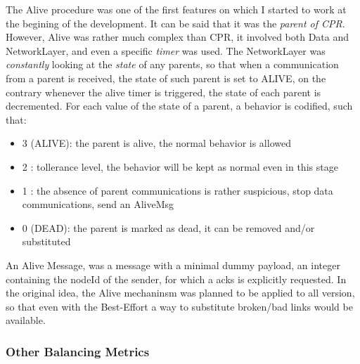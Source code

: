 \documentclass{article}
\begin{document}
The Alive procedure was one of the first features on which I started to work at the begining of the development. It can be said that it was the \emph{parent of CPR}. However, Alive was rather much complex than CPR, it involved both Data and NetworkLayer, and even a specific \textit{timer} was used. The NetworkLayer was \textit{constantly} looking at the \emph{state} of any parents, so that when a communication from a parent is received, the state of such parent is set to ALIVE, on the contrary whenever the alive timer is triggered, the state of each parent is decremented. For each value of the state of a parent, a behavior is codified, such that:
		\begin{itemize}
			\item 3 (ALIVE): the parent is alive, the normal behavior is allowed
			\item 2 : tollerance level, the behavior will be  kept as normal even in this stage
			\item 1 : the absence of parent communications is rather suspicious, stop data communications, send an AliveMsg
			\item 0 (DEAD): the parent is marked as dead, it can be removed and/or substituted
		\end{itemize}
An Alive Message, was a message with a minimal dummy payload, an integer containing the nodeId of the sender, for which a acks is explicitly requested. In the original idea, the Alive mechaninsm was planned to be applied to all version, so that even with the Best-Effort a way to substitute broken/bad links would be available.

		\subsubsection{Other Balancing Metrics}
	
\end{document}
